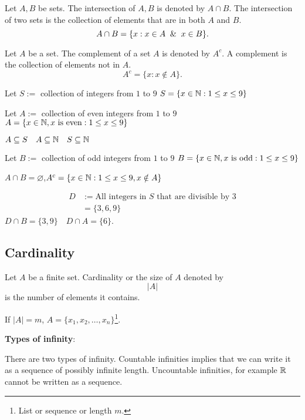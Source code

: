 \documentclass[10pt, a4paper]{article}
\begin{document}
\begin{definition}
    Let $A, B$ be sets. The intersection of $A, B$ is denoted by $A \cap B$. The intersection of two sets is the collection of elements that are in both $A$ and $B$.
    \[
    A \cap B = \{x: x \in A \And x \in B\}.
    \]
\end{definition}

\begin{definition}
    Let $A$ be a set. The complement of a set $A$ is denoted by $A ^ c$. A complement is the collection of elements not in $A$.
    \[
    A ^ c = \{x: x \notin A\}.
    \]
\end{definition}

\begin{example}
    Let $S :=$ collection of integers from $1$ to $9$ 
    $S = \{x \in \mathbb{N}: 1 \leq x \leq 9\}$
    
    Let $A :=$ collection of even integers from $1$ to $9$ 
    $A = \{x \in \mathbb{N}, x \text{ is even}: 1 \leq x \leq 9\}$

    $A \subseteq S\quad A \subseteq \mathbb{N}\quad S\subseteq\mathbb{N}$

    Let $B :=$ collection of odd integers from $1$ to $9$ 
    $B = \{x \in \mathbb{N}, x \text{ is odd}: 1 \leq x \leq 9\}$

    $A \cap B = \varnothing$,\qquad $A ^ c = \{x \in \mathbb{N}: 1\leq x \leq 9, x \notin A\}$

    \begin{align*}
    D &:= \text{All integers in } S \text{ that are divisible by 3} \\
    &= \{3, 6, 9\}
    \end{align*}
    $D \cap B = \{3, 9\}\quad D\cap A = \{6\}$.
\end{example}

\subsection{Cardinality}
\begin{definition}[Cardinality]
    Let $A$ be a finite set. Cardinality or the size of $A$ denoted by
    \[
    |A|
    \]
    is the number of elements it contains.
\end{definition}

If $|A| = m$, $A = \{x_1, x_2, \dots, x_n\}$\footnote{List or sequence or length $m$.}.

\textbf{Types of infinity}:

There are two types of infinity. Countable infinities implies that we can write it as a sequence of possibly infinite length. Uncountable infinities, for example $\mathbb{R}$ cannot be written as a sequence.
\end{document}
